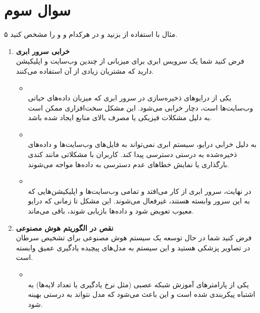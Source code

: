 \section{سوال سوم}

۵ مثال با استفاده از  بزنید و در هرکدام  و  و  را مشخص کنید.


\begin{qsolve}[]
	\begin{enumerate}
		\item 
		\textbf{خرابی سرور ابری }\\
		فرض کنید شما یک سرویس ابری برای میزبانی از چندین وب‌سایت و اپلیکیشن دارید که مشتریان زیادی از آن استفاده می‌کنند.
		\begin{itemize}
			\item {}\\
			یکی از درایوهای ذخیره‌سازی در سرور ابری که میزبان داده‌های حیاتی وب‌سایت‌ها است، دچار خرابی می‌شود. این مشکل سخت‌افزاری ممکن است به دلیل مشکلات فیزیکی یا مصرف بالای منابع ایجاد شده باشد.
			
			\item {}\\
			به دلیل خرابی درایو، سیستم ابری نمی‌تواند به فایل‌های وب‌سایت‌ها و داده‌های ذخیره‌شده به درستی دسترسی پیدا کند. کاربران با مشکلاتی مانند کندی بارگذاری یا نمایش خطاهای عدم دسترسی به داده‌ها مواجه می‌شوند.
			
			\item {}\\
			در نهایت، سرور ابری از کار می‌افتد و تمامی وب‌سایت‌ها و اپلیکیشن‌هایی که به این سرور وابسته هستند، غیرفعال می‌شوند. این مشکل تا زمانی که درایو معیوب تعویض شود و داده‌ها بازیابی شوند، باقی می‌ماند. 
		\end{itemize}
		
		
		\item 
		\textbf{نقص در الگوریتم هوش مصنوعی}\\
		فرض کنید شما در حال توسعه یک سیستم هوش مصنوعی برای تشخیص سرطان در تصاویر پزشکی هستید و این سیستم به مدل‌های پیچیده یادگیری عمیق وابسته است.
		
		\begin{itemize}
			\item {}\\
			یکی از پارامترهای آموزش شبکه عصبی (مثل نرخ یادگیری یا تعداد لایه‌ها) به اشتباه پیکربندی شده است و این باعث می‌شود که مدل نتواند به درستی بهینه شود.
			

\end{itemize}
\end{enumerate}
\end{qsolve}
